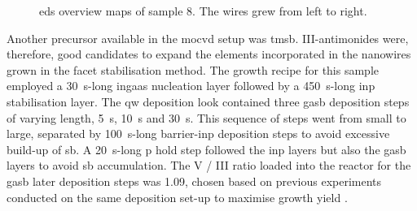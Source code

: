 \begin{figure}
    \centering
    \caption[\acs{eds} overview maps of sample 8.]{\acs{eds} overview maps of sample 8. The wires grew from left to right.}
    \label{fig:s8_EDS_maps}
\end{figure}

Another precursor available in the \acs{mocvd} setup was \acf{tmsb}. III-antimonides were, therefore, good candidates to expand the elements incorporated in the nanowires grown in the  facet stabilisation method. The growth recipe for this sample employed a \qty{30}{\second}-long \acs{ingaas} nucleation layer followed by a \qty{450}{\second}-long \acs{inp} stabilisation layer. The \acl{qw} deposition look contained three \acf{gasb} deposition steps of varying length, \qty{5}{\second}, \qty{10}{\second} and \qty{30}{\second}. This sequence of steps went from small to large, separated by \qty{100}{\second}-long barrier-\acs{inp} deposition steps to avoid excessive build-up of \acl{sb}. A \qty{20}{\second}-long \acl{p} hold step followed the \acs{inp} layers but also the \acs{gasb} layers to avoid \acl{sb} accumulation. The V / III ratio loaded into the reactor for the \acs{gasb} later deposition steps was \num{1.09}, chosen based on previous experiments conducted on the same deposition set-up to maximise growth yield \cite{Borg2017}.


